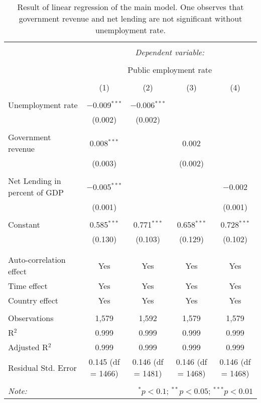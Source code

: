 
\begin{table}[!htbp]
\begin{center}
  \caption{Result of linear regression of the main model. One observes that
    government revenue and net lending are not significant without unemployment rate.}
  \label{tbl:main-coeff}
\begin{tabular}{@{\extracolsep{5pt}}lcccc}
\\[-1.8ex]\hline
\hline \\[-1.8ex]
 & \multicolumn{4}{c}{\textit{Dependent variable:}} \\
\cline{2-5}
\\[-1.8ex] & \multicolumn{4}{c}{Public employment rate} \\
\\[-1.8ex] & (1) & (2) & (3) & (4)\\
\hline \\[-1.8ex]
 Unemployment rate & $-$0.009$^{***}$ & $-$0.006$^{***}$ &  &  \\
  & (0.002) & (0.002) &  &  \\
  & & & & \\
 Government revenue & 0.008$^{***}$ &  & 0.002 &  \\
  & (0.003) &  & (0.002) &  \\
  & & & & \\
 Net Lending in percent of GDP & $-$0.005$^{***}$ &  &  & $-$0.002 \\
  & (0.001) &  &  & (0.001) \\
  & & & & \\
 Constant & 0.585$^{***}$ & 0.771$^{***}$ & 0.658$^{***}$ & 0.728$^{***}$ \\
  & (0.130) & (0.103) & (0.129) & (0.102) \\
  & & & & \\
\hline \\[-1.8ex]
Auto-correlation effect & Yes & Yes & Yes & Yes \\
Time effect & Yes & Yes & Yes & Yes \\
Country effect & Yes & Yes & Yes & Yes \\
\hline \\[-1.8ex]
Observations & 1,579 & 1,592 & 1,579 & 1,579 \\
R$^{2}$ & 0.999 & 0.999 & 0.999 & 0.999 \\
Adjusted R$^{2}$ & 0.999 & 0.999 & 0.999 & 0.999 \\
Residual Std. Error & 0.145 (df = 1466) & 0.146 (df = 1481) & 0.146 (df = 1468) & 0.146 (df = 1468) \\
\hline
\hline \\[-1.8ex]
\textit{Note:}  & \multicolumn{4}{r}{$^{*}p<0.1$; $^{**}p<0.05$; $^{***}p<0.01$} \\
\end{tabular}
\end{center}
\end{table}
